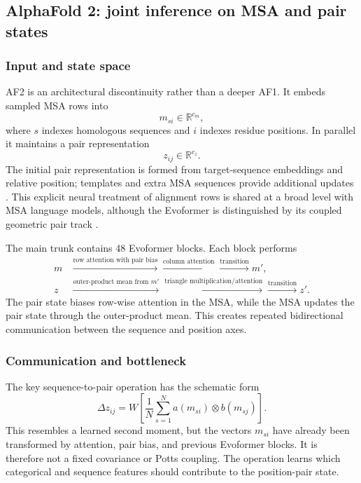 \documentclass[10pt]{article}
\newcommand{\R}{\mathbb R}
\begin{document}
\subsection{AlphaFold 2: joint inference on MSA and pair states}

\subsubsection{Input and state space}

AF2 is an architectural discontinuity rather than a deeper AF1.  It embeds sampled MSA rows into
\begin{equation}
m_{si}\in\R^{c_m},
\end{equation}
where $s$ indexes homologous sequences and $i$ indexes residue positions.  In parallel it maintains
a pair representation
\begin{equation}
z_{ij}\in\R^{c_z}.
\end{equation}
The initial pair representation is formed from target-sequence embeddings and relative position;
templates and extra MSA sequences provide additional updates \cite{jumper2021}.
This explicit neural treatment of alignment rows is shared at a broad level with MSA language
models, although the Evoformer is distinguished by its coupled geometric pair track
\cite{rao2021}.

The main trunk contains 48 Evoformer blocks.  Each block performs
\begin{align}
m&\xrightarrow{\text{row attention with pair bias}}
\xrightarrow{\text{column attention}}
\xrightarrow{\text{transition}}m',\\
z&\xrightarrow{\text{outer-product mean from }m'}
\xrightarrow{\text{triangle multiplication/attention}}
\xrightarrow{\text{transition}}z'.
\end{align}
The pair state biases row-wise attention in the MSA, while the MSA updates the pair state through
the outer-product mean.  This creates repeated bidirectional communication between the sequence and
position axes.

\subsubsection{Communication and bottleneck}

The key sequence-to-pair operation has the schematic form
\begin{equation}
\Delta z_{ij}
=W\left[
\frac{1}{N}
\sum_{s=1}^N
a(m_{si})\otimes b(m_{sj})
\right].
\label{eq:outer-product-mean}
\end{equation}
This resembles a learned second moment, but the vectors $m_{si}$ have already been transformed by
attention, pair bias, and previous Evoformer blocks.  It is therefore not a fixed covariance or
Potts coupling.  The operation learns which categorical and sequence features should contribute to
the position-pair state.
\end{document}
